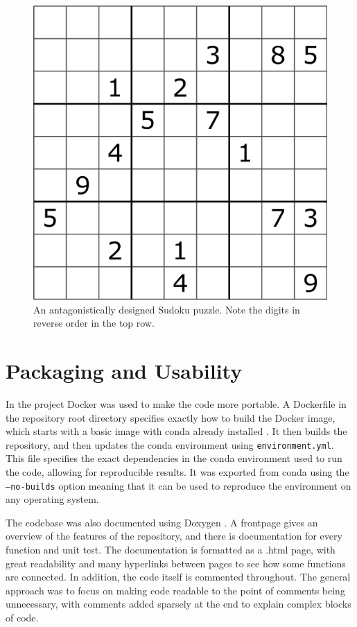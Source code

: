 \documentclass[12pt]{article}
\begin{document}
\begin{figure}[hbt]
    \includegraphics[scale=0.3]{Sudoku_puzzle_hard_for_brute_force.png}
    \caption{An antagonistically designed Sudoku puzzle. Note the digits in reverse order in the top row\cite{antagonist}.}
    \label{antagonist_clues}
\end{figure}

\section*{Packaging and Usability}

In the project Docker was used to make the code more portable.
A Dockerfile in the repository root directory specifies exactly how to build the Docker image, which starts with a basic image with conda already installed \cite{docker}.
It then builds the repository, and then updates the conda environment using \texttt{environment.yml}.
This file specifies the exact dependencies in the conda environment used to run the code, allowing for reproducible results.
It was exported from conda using the \texttt{--no-builds} option meaning that it can be used to reproduce the environment on any operating system.

The codebase was also documented using Doxygen \cite{doxygen}.
A frontpage gives an overview of the features of the repository, and there is documentation for every function and unit test.
The documentation is formatted as a .html page, with great readability and many hyperlinks between pages to see how some functions are connected.
In addition, the code itself is commented throughout.
The general approach was to focus on making code readable to the point of comments being unnecessary, with comments added sparsely at the end to explain complex blocks of code.
\end{document}
